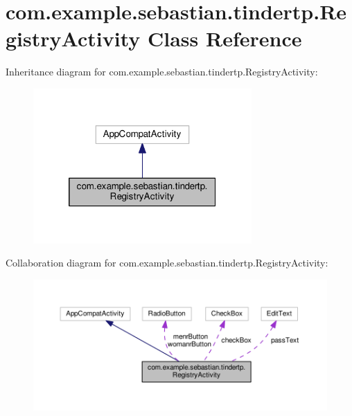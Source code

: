 \hypertarget{classcom_1_1example_1_1sebastian_1_1tindertp_1_1RegistryActivity}{}\section{com.\+example.\+sebastian.\+tindertp.\+Registry\+Activity Class Reference}
\label{classcom_1_1example_1_1sebastian_1_1tindertp_1_1RegistryActivity}


Inheritance diagram for com.\+example.\+sebastian.\+tindertp.\+Registry\+Activity\+:\nopagebreak
\begin{figure}[H]
\begin{center}
\leavevmode
\includegraphics[width=236pt]{classcom_1_1example_1_1sebastian_1_1tindertp_1_1RegistryActivity__inherit__graph}
\end{center}
\end{figure}


Collaboration diagram for com.\+example.\+sebastian.\+tindertp.\+Registry\+Activity\+:
\nopagebreak
\begin{figure}[H]
\begin{center}
\leavevmode
\includegraphics[width=350pt]{classcom_1_1example_1_1sebastian_1_1tindertp_1_1RegistryActivity__coll__graph}
\end{center}
\end{figure}
